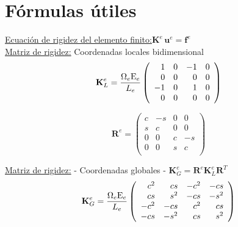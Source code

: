 \newcommand{\mE}{{\rm E}}
\newcommand{\mG}{{\rm G}}

\chapter{Fórmulas útiles}


\begin{center}
\end{center}

\underline{
	Ecuación de rigidez del elemento finito:}\quad $\textbf{K}^e \,\textbf{u}^e = \textbf{f}^e$\\

\underline{
	Matriz de rigidez:} Coordenadas locales bidimensional
%
\vspace{-0.3cm}
$$
\textbf{K}_ L^e= %
\frac{\Omega_e\mE_e}{L_e}
\left(
\begin{array}{rrrr}
1  & 0 & -1 & 0 \\
0  & 0 &  0 & 0 \\
-1 & 0 &  1 & 0 \\
0  & 0 &  0 & 0 \\
\end{array}
\right)
$$

$$
\textbf{R}^e = %
\left(
\begin{array}{rrrr}
c  & -s &  0 & 0 \\
s  & c &  0 & 0 \\
0  & 0 &  c & -s \\
0  & 0 & s & c \\
\end{array}
\right)
$$

\underline{
	Matriz de rigidez:} - Coordenadas globales - $\textbf{K}_ G^e=\textbf{R}^e \textbf{K}_ L^e\textbf{R}^T$
\vspace{-0.3cm}
$$
\textbf{K}_ G^e= %
\frac{\Omega_e\mE_e}{L_e}
\left(
\begin{array}{rrrr}
c^2  & cs   & -c^2 &  -cs \\
cs  & s^2  &  -cs & -s^2 \\
-c^2  & -cs  &  c^2 &   cs \\
-cs  & -s^2 &   cs &  s^2 \\
\end{array}
\right)
$$

